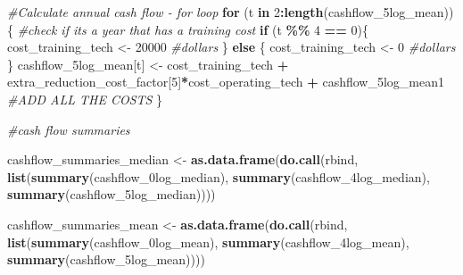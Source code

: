 \documentclass[
]{article}
\newenvironment{Shaded}{\begin{snugshade}}{\end{snugshade}}
\newcommand{\CommentTok}[1]{\textcolor[rgb]{0.56,0.35,0.01}{\textit{#1}}}
\newcommand{\ControlFlowTok}[1]{\textcolor[rgb]{0.13,0.29,0.53}{\textbf{#1}}}
\newcommand{\DecValTok}[1]{\textcolor[rgb]{0.00,0.00,0.81}{#1}}
\newcommand{\FunctionTok}[1]{\textcolor[rgb]{0.13,0.29,0.53}{\textbf{#1}}}
\newcommand{\NormalTok}[1]{#1}
\newcommand{\OtherTok}[1]{\textcolor[rgb]{0.56,0.35,0.01}{#1}}
\newcommand{\SpecialCharTok}[1]{\textcolor[rgb]{0.81,0.36,0.00}{\textbf{#1}}}
\begin{document}
\begin{Shaded}
\begin{Highlighting}[]
\CommentTok{\#Calculate annual cash flow {-} for loop}
\ControlFlowTok{for}\NormalTok{ (t }\ControlFlowTok{in} \DecValTok{2}\SpecialCharTok{:}\FunctionTok{length}\NormalTok{(cashflow\_5log\_mean))\{}
  \CommentTok{\#check if it\textquotesingle{}s a year that has a training cost}
  \ControlFlowTok{if}\NormalTok{ (t }\SpecialCharTok{\%\%} \DecValTok{4} \SpecialCharTok{==} \DecValTok{0}\NormalTok{)\{}
\NormalTok{    cost\_training\_tech }\OtherTok{\textless{}{-}} \DecValTok{20000} \CommentTok{\#dollars}
\NormalTok{  \} }\ControlFlowTok{else}\NormalTok{ \{}
\NormalTok{    cost\_training\_tech }\OtherTok{\textless{}{-}} \DecValTok{0} \CommentTok{\#dollars}
\NormalTok{  \}}
\NormalTok{  cashflow\_5log\_mean[t] }\OtherTok{\textless{}{-}}\NormalTok{ cost\_training\_tech }\SpecialCharTok{+}\NormalTok{ extra\_reduction\_cost\_factor[}\DecValTok{5}\NormalTok{]}\SpecialCharTok{*}\NormalTok{cost\_operating\_tech }\SpecialCharTok{+}\NormalTok{ cashflow\_5log\_mean1 }\CommentTok{\#ADD ALL THE COSTS}
\NormalTok{\}}
\end{Highlighting}
\end{Shaded}

\begin{Shaded}
\begin{Highlighting}[]
\CommentTok{\#cash flow summaries}

\NormalTok{cashflow\_summaries\_median }\OtherTok{\textless{}{-}} \FunctionTok{as.data.frame}\NormalTok{(}\FunctionTok{do.call}\NormalTok{(rbind, }\FunctionTok{list}\NormalTok{(}\FunctionTok{summary}\NormalTok{(cashflow\_0log\_median), }\FunctionTok{summary}\NormalTok{(cashflow\_4log\_median), }\FunctionTok{summary}\NormalTok{(cashflow\_5log\_median))))}

\NormalTok{cashflow\_summaries\_mean }\OtherTok{\textless{}{-}} \FunctionTok{as.data.frame}\NormalTok{(}\FunctionTok{do.call}\NormalTok{(rbind, }\FunctionTok{list}\NormalTok{(}\FunctionTok{summary}\NormalTok{(cashflow\_0log\_mean), }\FunctionTok{summary}\NormalTok{(cashflow\_4log\_mean), }\FunctionTok{summary}\NormalTok{(cashflow\_5log\_mean))))}
\end{Highlighting}
\end{Shaded}
\end{document}
